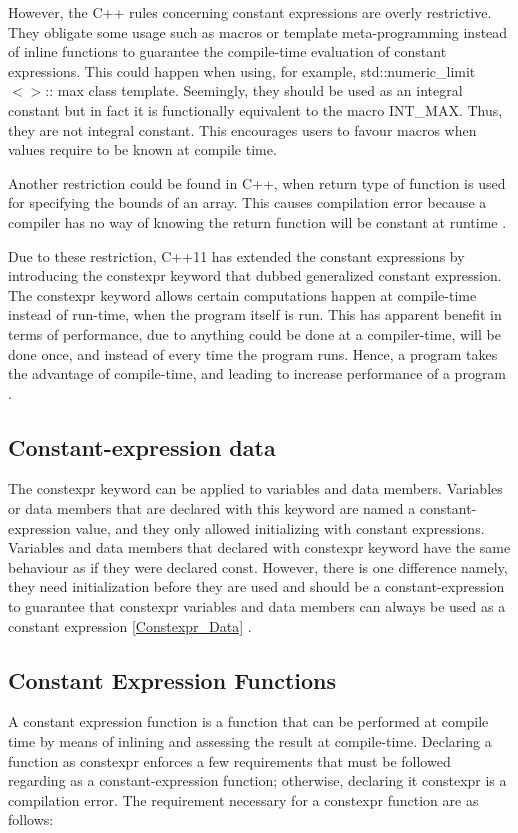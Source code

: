 \documentclass[11pt]{report}
\begin{document}
However, the C++ rules concerning constant expressions are overly restrictive. They obligate some usage such as macros or template meta-programming instead of inline functions to guarantee the compile-time evaluation of constant expressions. This could happen when using, for example, std::numeric\_limit$<>$:: max  class template.  Seemingly, they should be used as an integral constant but in fact it is functionally equivalent to the macro INT\_MAX. Thus, they are not integral constant. This encourages users to favour macros when values require to be known at compile time.
\newline

Another restriction could be found in C++, when return type of function is used for specifying the bounds of an array. This causes compilation error because a compiler has no way of knowing the return function will be constant at runtime \cite{Stroustrup:2012:Cpp11}. 
\newline

Due to these restriction, C++11 has extended the constant expressions by introducing the constexpr keyword that dubbed generalized constant expression. The constexpr keyword allows certain computations happen at compile-time instead of run-time, when the program itself is run.  This has apparent benefit in terms of performance, due to anything could be done at a compiler-time, will be done once, and instead of every time the program runs. Hence, a program takes the advantage of compile-time, and leading to increase performance of a program \cite{Williams:2012:CCA}.

\subsection{Constant-expression data}
\label{subsection: constant-expression data}
The constexpr keyword can be applied to variables and data members.  Variables or data members that are declared with this keyword are named a constant-expression value, and they only allowed initializing with constant expressions. Variables and data members that declared with constexpr keyword have the same behaviour as if they were declared const. However, there is one difference namely, they need initialization before they are used and should be a constant-expression to guarantee that constexpr variables and data members can always be used as a constant expression \ref{Constexpr_Data} \cite{Williams:2012:CCA}.
\newline

\subsection{Constant Expression Functions}
\label{Constant Expression Functions}
A constant expression function is a function that can be performed at compile time by means of inlining and assessing the result at compile-time. Declaring a function as constexpr enforces a few requirements that must be followed regarding as a constant-expression function; otherwise, declaring it constexpr is a compilation error.  The requirement necessary for a constexpr function are as follows:
\end{document}
